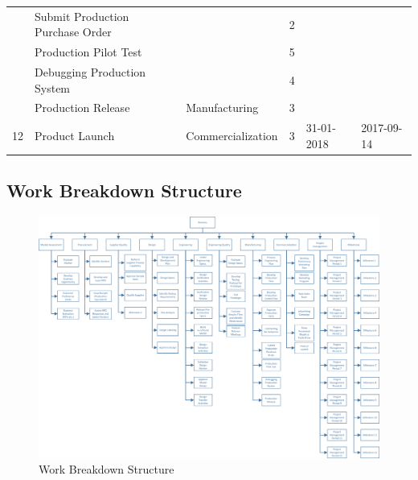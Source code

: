 \begin{landscape}
\begin{table}[H]
{\begin{tabular}{|l|l|l|l|l|l|}
 & Submit Production Purchase Order &  & 2 & \cellcolor[HTML]{9AFF99} & \cellcolor[HTML]{96FFFB} \\ \cline{2-2} \cline{4-4}
 & Production Pilot Test &  & 5 & \cellcolor[HTML]{9AFF99} & \cellcolor[HTML]{96FFFB} \\ \cline{2-2} \cline{4-4}
 & Debugging Production System &  & 4 & \cellcolor[HTML]{9AFF99} & \cellcolor[HTML]{96FFFB} \\ \cline{2-2} \cline{4-4}
 & Production Release & \multirow{-4}{*}{Manufacturing} & 3 & \cellcolor[HTML]{9AFF99} & \cellcolor[HTML]{96FFFB} \\ \cline{2-4}
\multirow{-5}{*}{12} & Product Launch & Commercialization & 3 & \multirow{-5}{*}{\cellcolor[HTML]{9AFF99}31-01-2018} & \multirow{-5}{*}{\cellcolor[HTML]{96FFFB}2017-09-14} \\ \hline
\end{tabular}%
}
\end{table}

\end{landscape}

\restoregeometry



\begin{landscape}

\subsection{Work Breakdown Structure}

\begin{figure}[H]
\centering
\includegraphics[scale=0.75]{WBS.png}
%
\caption{Work Breakdown Structure}
\label{fig:wbs}
\end{figure}

\end{landscape}

